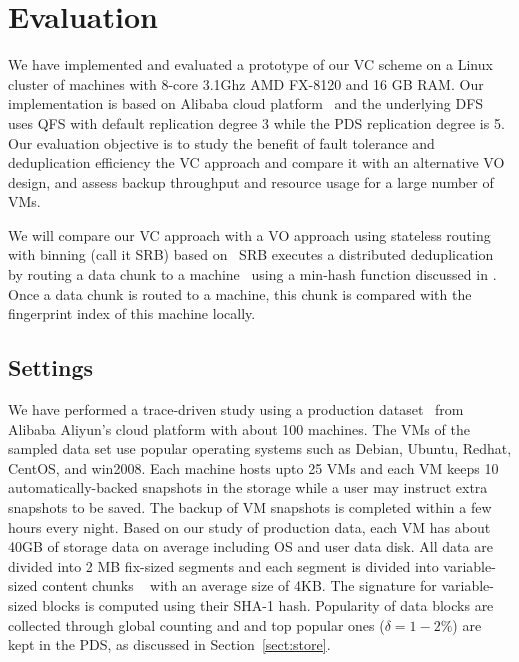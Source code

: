 \section{Evaluation}
\label{sect:evaluation}
We have implemented and evaluated a prototype of our VC scheme on a Linux cluster of machines with
8-core 3.1Ghz AMD FX-8120 and 16 GB RAM. 
Our implementation is based on Alibaba cloud platform~\cite{Aliyun,WeiZhangIEEE}
and the underlying DFS uses  QFS with default replication degree 3 while the PDS replication degree is 5.
Our evaluation objective is to
study the benefit of fault tolerance and   deduplication efficiency  the VC approach and compare it
with an alternative VO design, and assess backup throughput and  resource usage for a large number of VMs.

We will compare our VC approach with
a VO approach  using stateless routing with binning (call it SRB) 
based on~\cite{Dong2011,extreme_binning09}
SRB executes a distributed deduplication by routing a data chunk to a machine~\cite{Dong2011}
using  a min-hash function discussed in \cite{extreme_binning09}. Once a data chunk is routed to
a machine, this chunk is compared with the fingerprint index of this machine locally. 

\subsection{Settings}
We have performed a trace-driven study using a production dataset~\cite{WeiZhangIEEE} from 
Alibaba Aliyun's cloud platform with about 100 machines. 
The VMs  of the sampled  data set   use popular operating systems such as 
Debian, Ubuntu, Redhat, CentOS, and win2008. 
Each machine hosts upto 25 VMs and each VM keeps 10 automatically-backed snapshots in the storage while
a user may instruct extra snapshots to be saved.
The backup of VM snapshots is completed within a few  hours every night.
Based on our study of production  data,  each VM has about  40GB of storage  data  on average
including OS and user data disk.
All data are divided into 2 MB fix-sized segments and each segment is divided into 
variable-sized content chunks ~\cite{similar94,rabin81} with an average size of 4KB.
The signature for variable-sized blocks is computed using their SHA-1 hash. 
Popularity of data blocks are collected through global counting and 
and top popular ones ($\delta=1-2\%$)  are  kept in the PDS, as discussed in Section~\ref{sect:store}.

